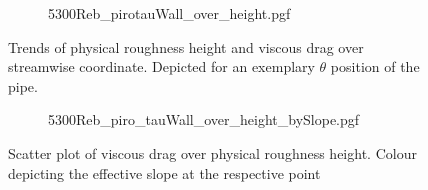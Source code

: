 





\begin{figure}
    \centering
    \begin{subfigure}{0.75\textwidth}
        \centering
        {5300Reb_pirotauWall_over_height.pgf}
    \end{subfigure}
    \caption[Trends of physical roughness height and viscous drag over streamwise coordinate]{Trends of physical roughness height and viscous drag over streamwise coordinate. Depicted for an exemplary $\theta$ position of the pipe.}
    \label{fig: roughness height and viscous stress Reb 5300 piro}
\end{figure}
\begin{figure}
    \centering
    \begin{subfigure}{0.7\textwidth}
        \hspace{0.9cm}
        {5300Reb_piro_tauWall_over_height_bySlope.pgf}
    \end{subfigure}
    \caption[Scatter plot of viscous drag over physical roughness height]{Scatter plot of viscous drag over physical roughness height. Colour depicting the effective slope at the respective point}
    \label{fig: scatterplot piro Reb 5300}
\end{figure}

